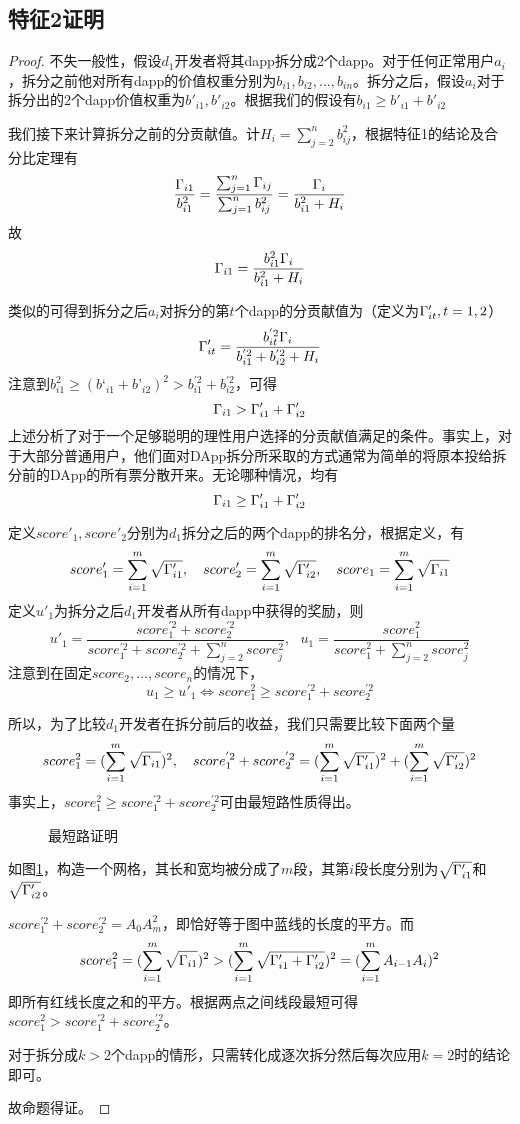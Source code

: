 \subsection{特征2证明}
\begin{proof}
	 不失一般性，假设$d_1$开发者将其dapp拆分成2个dapp。对于任何正常用户$a_i$，拆分之前他对所有dapp的价值权重分别为$b_{i1},b_{i2},...,b_{in}$。拆分之后，假设$a_i$对于拆分出的$2$个dapp价值权重为$b'_{i1},b'_{i2}$。根据我们的假设有$b_{i1} \geq b'_{i1}+b'_{i2}$

	 我们接下来计算拆分之前的分贡献值。计$H_i = \sum_{j=2}^n b_{ij}^2$，根据特征1的结论及合分比定理有
	 $$\frac{\Gamma_{i1}}{b_{i1}^2} = \frac{\sum_{j=1}^n \Gamma_{ij}}{\sum_{j=1}^n b_{ij}^2} = \frac{\Gamma_i}{b_{i1}^2+H_i}$$
	 故
	 $$\Gamma_{i1}=\frac{b_{i1}^2\Gamma_i}{b_{i1}^2+H_i}$$

     类似的可得到拆分之后$a_i$对拆分的第$t$个dapp的分贡献值为（定义为$\Gamma'_{it},t=1,2$）
	 $$\Gamma'_{it} =  \frac{b_{it}^{'2}\Gamma_i}{b_{i1}^{'2}+b_{i2}^{'2}+H_i}$$
	 注意到$b_{i1}^2 \geq (b‘_{i1}+b’_{i2})^2 >b_{i1}^{'2}+b_{i2}^{'2}$，可得
	 $$\Gamma_{i1} > \Gamma'_{i1}+\Gamma'_{i2}$$
	 上述分析了对于一个足够聪明的理性用户选择的分贡献值满足的条件。事实上，对于大部分普通用户，他们面对DApp拆分所采取的方式通常为简单的将原本投给拆分前的DApp的所有票分散开来。无论哪种情况，均有
	 	$$\Gamma_{i1} \geq \Gamma'_{i1}+\Gamma'_{i2}$$

	 定义$score'_1,score'_2$分别为$d_1$拆分之后的两个dapp的排名分，根据定义，有
	 $$score'_1 =  \sum_{i=1}^m \sqrt{\Gamma'_{i1}},~~~score'_2 =  \sum_{i=1}^m \sqrt{\Gamma'_{i2}},~~~score_1 = \sum_{i=1}^m \sqrt{\Gamma_{i1}}$$
	 定义$u'_1$为拆分之后$d_1$开发者从所有dapp中获得的奖励，则
	 $$u'_1=\frac{score_1^{'2}+score_2^{'2}}{score_1^{'2}+score_2^{'2}+\sum_{j=2}^n score_j^2},~~~u_1=\frac{score^2_1}{score_1^2+\sum_{j=2}^n score_j^2}$$
	 注意到在固定$score_2,...,score_n$的情况下，
	 $$ u_1 \geq u'_1 \Leftrightarrow score_1^2 \geq score_1^{'2}+score_2^{'2}$$

	 所以，为了比较$d_1$开发者在拆分前后的收益，我们只需要比较下面两个量
	 $$score_1^2 = (\sum_{i=1}^m \sqrt{\Gamma_{i1}})^2,~~~score_1^{'2}+score_2^{'2}=  (\sum_{i=1}^m \sqrt{\Gamma'_{i1}})^2+(\sum_{i=1}^m \sqrt{\Gamma'_{i2}})^2$$
	 事实上，$score_1^2 \geq score_1^{'2}+score_2^{'2}$可由最短路性质得出。
	 \begin{figure}
	 	\centering
    
	 	\caption{最短路证明 \label{fig:path}}
	 \end{figure}
	 如图\ref{fig:path}，构造一个网格，其长和宽均被分成了$m$段，其第$i$段长度分别为$\sqrt{\Gamma'_{i1}}$和$\sqrt{\Gamma'_{i2}}$。

	 $score_1^{'2}+score_2^{'2}=A_0A_m^2$，即恰好等于图中蓝线的长度的平方。而
	 $$score_1^2 = (\sum_{i=1}^m \sqrt{\Gamma_{i1}})^2 > (\sum_{i=1}^m \sqrt{\Gamma'_{i1}+\Gamma'_{i2}})^2 = (\sum_{i=1}^m A_{i-1}A_i)^2$$
	 即所有红线长度之和的平方。根据两点之间线段最短可得$score_1^2 >score_1^{'2}+score_2^{'2}$。

	 对于拆分成$k>2$个dapp的情形，只需转化成逐次拆分然后每次应用$k=2$时的结论即可。

	 故命题得证。
\end{proof}

